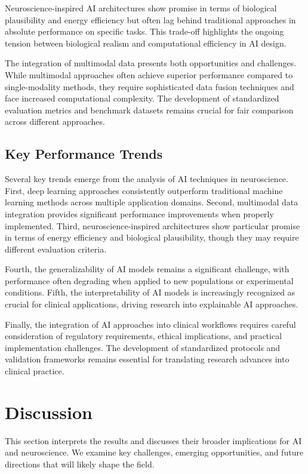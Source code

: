 \documentclass[conference]{IEEEtran}
\begin{document}
Neuroscience-inspired AI architectures show promise in terms of biological plausibility and energy efficiency but often lag behind traditional approaches in absolute performance on specific tasks. This trade-off highlights the ongoing tension between biological realism and computational efficiency in AI design.

The integration of multimodal data presents both opportunities and challenges. While multimodal approaches often achieve superior performance compared to single-modality methods, they require sophisticated data fusion techniques and face increased computational complexity. The development of standardized evaluation metrics and benchmark datasets remains crucial for fair comparison across different approaches.

\subsection{Key Performance Trends}

Several key trends emerge from the analysis of AI techniques in neuroscience. First, deep learning approaches consistently outperform traditional machine learning methods across multiple application domains. Second, multimodal data integration provides significant performance improvements when properly implemented. Third, neuroscience-inspired architectures show particular promise in terms of energy efficiency and biological plausibility, though they may require different evaluation criteria.

Fourth, the generalizability of AI models remains a significant challenge, with performance often degrading when applied to new populations or experimental conditions. Fifth, the interpretability of AI models is increasingly recognized as crucial for clinical applications, driving research into explainable AI approaches.

Finally, the integration of AI approaches into clinical workflows requires careful consideration of regulatory requirements, ethical implications, and practical implementation challenges. The development of standardized protocols and validation frameworks remains essential for translating research advances into clinical practice.

\section{Discussion}

This section interprets the results and discusses their broader implications for AI and neuroscience. We examine key challenges, emerging opportunities, and future directions that will likely shape the field.
\end{document}
